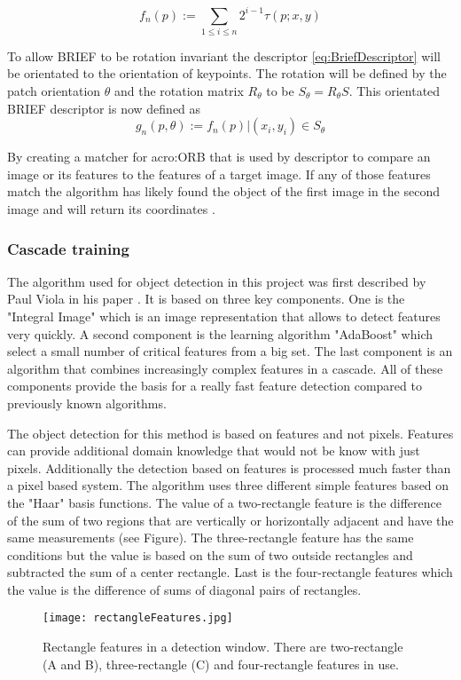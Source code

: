 \begin{equation}\label{eq:BinaryFeature} f_{n}(p) := \sum_{1 \leq i \leq n}2^{i-1} \tau(p;x,y)\end{equation}

To allow BRIEF to be rotation invariant the descriptor \eqref{eq:BriefDescriptor} will be orientated to the orientation of keypoints. The rotation will be defined by the patch orientation $\theta$ and the rotation matrix $R_{\theta}$ to be $S_{\theta} = R_{\theta}S$.
This orientated BRIEF descriptor is now defined as
\begin{equation}\label{eq:BriefDescriptor} g_{n}(p,\theta) := f_{n}(p)|(x_{i},y_{i}) \in S_{\theta}\end{equation}

By creating a matcher for \acrshort{acro:ORB} that is used by descriptor to compare an image or its features to the features of a target image. If any of those features match the algorithm has likely found the object of the first image in the second image and will return its coordinates \citep{rublee_rabaud_konolige_bradski_2011}.

\subsubsection{Cascade training}
\label{sub:CascadeTraining}
The algorithm used for object detection in this project was first described by Paul Viola in his paper . It is based on three key components. One is the "Integral Image" which is an image representation that allows to detect features very quickly. A second component is the learning algorithm "AdaBoost" which select a small number of critical features from a big set. The last component is an algorithm that combines increasingly complex features in a cascade. All of these components provide the basis for a really fast feature detection compared to previously known algorithms.

The object detection for this method is based on features and not pixels. Features can provide additional domain knowledge that would not be know with just pixels. Additionally the detection based on features is processed much faster than a pixel based system. The algorithm uses three different simple features based on the "Haar" basis functions. The value of a two-rectangle feature is the difference of the sum of two regions that are vertically or horizontally adjacent and have the same measurements (see Figure). The three-rectangle feature has the same conditions but the value is based on the sum of two outside rectangles and subtracted the sum of a center rectangle. Last is the four-rectangle features which the value is the difference of sums of diagonal pairs of rectangles.
\begin{figure}[H]
	\centering
	\texttt{[image: rectangleFeatures.jpg]}
	\caption{Rectangle features in a detection window. There are two-rectangle (A and B), three-rectangle (C) and four-rectangle features in use.}
	\label{fig:rectFeat}
\end{figure}

